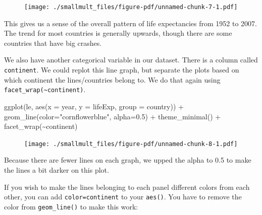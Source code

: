 \documentclass[
  letterpaper,
  DIV=11,
  numbers=noendperiod]{scrreprt}
\newenvironment{Shaded}{\begin{snugshade}}{\end{snugshade}}
\newcommand{\AttributeTok}[1]{\textcolor[rgb]{0.40,0.45,0.13}{#1}}
\newcommand{\FloatTok}[1]{\textcolor[rgb]{0.68,0.00,0.00}{#1}}
\newcommand{\FunctionTok}[1]{\textcolor[rgb]{0.28,0.35,0.67}{#1}}
\newcommand{\NormalTok}[1]{\textcolor[rgb]{0.00,0.23,0.31}{#1}}
\newcommand{\SpecialCharTok}[1]{\textcolor[rgb]{0.37,0.37,0.37}{#1}}
\newcommand{\StringTok}[1]{\textcolor[rgb]{0.13,0.47,0.30}{#1}}
\begin{document}
\begin{figure}[H]

{\centering \texttt{[image: ./smallmult\_files/figure-pdf/unnamed-chunk-7-1.pdf]}

}

\end{figure}

This gives us a sense of the overall pattern of life expectancies from
1952 to 2007. The trend for most countries is generally upwards, though
there are some countries that have big crashes.

We also have another categorical variable in our dataset. There is a
column called \texttt{continent}. We could replot this line graph, but
separate the plots based on which continent the lines/countries belong
to. We do that again using
\texttt{facet\_wrap(\textasciitilde{}continent)}.

\begin{Shaded}
\begin{Highlighting}[]
\FunctionTok{ggplot}\NormalTok{(le, }\FunctionTok{aes}\NormalTok{(}\AttributeTok{x =}\NormalTok{ year, }\AttributeTok{y =}\NormalTok{ lifeExp, }\AttributeTok{group =}\NormalTok{ country)) }\SpecialCharTok{+} 
  \FunctionTok{geom\_line}\NormalTok{(}\AttributeTok{color=}\StringTok{"cornflowerblue"}\NormalTok{, }\AttributeTok{alpha=}\FloatTok{0.5}\NormalTok{) }\SpecialCharTok{+}
  \FunctionTok{theme\_minimal}\NormalTok{() }\SpecialCharTok{+}
  \FunctionTok{facet\_wrap}\NormalTok{(}\SpecialCharTok{\textasciitilde{}}\NormalTok{continent)}
\end{Highlighting}
\end{Shaded}

\begin{figure}[H]

{\centering \texttt{[image: ./smallmult\_files/figure-pdf/unnamed-chunk-8-1.pdf]}

}

\end{figure}

Because there are fewer lines on each graph, we upped the alpha to 0.5
to make the lines a bit darker on this plot.

If you wish to make the lines belonging to each panel different colors
from each other, you can add \texttt{color=continent} to your
\texttt{aes()}. You have to remove the color from \texttt{geom\_line()}
to make this work:
\end{document}
